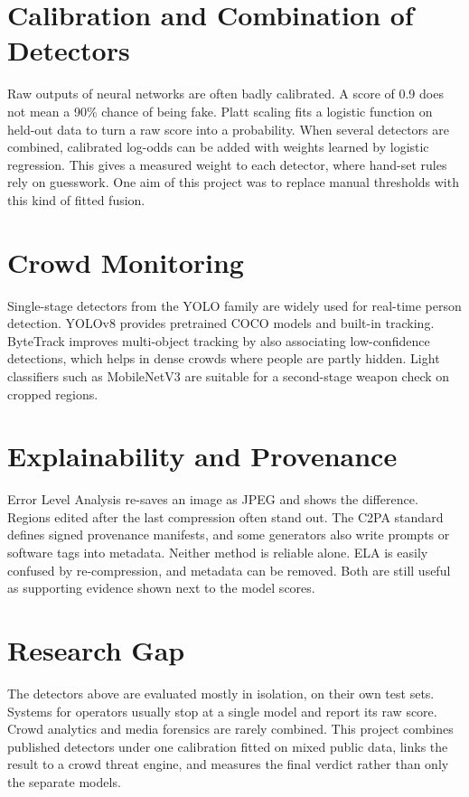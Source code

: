 \documentclass[12pt,a4paper,oneside]{report}
\begin{document}
\section{Calibration and Combination of Detectors}
Raw outputs of neural networks are often badly calibrated. A score of 0.9 does not mean a 90\% chance of being fake\cite{guo2017}. Platt scaling\cite{platt1999} fits a logistic function on held-out data to turn a raw score into a probability. When several detectors are combined, calibrated log-odds can be added with weights learned by logistic regression. This gives a measured weight to each detector, where hand-set rules rely on guesswork. One aim of this project was to replace manual thresholds with this kind of fitted fusion.

\section{Crowd Monitoring}
Single-stage detectors from the YOLO family are widely used for real-time person detection. YOLOv8\cite{jocher2023} provides pretrained COCO models and built-in tracking. ByteTrack\cite{zhang2022} improves multi-object tracking by also associating low-confidence detections, which helps in dense crowds where people are partly hidden. Light classifiers such as MobileNetV3\cite{howard2019} are suitable for a second-stage weapon check on cropped regions.

\section{Explainability and Provenance}
Error Level Analysis\cite{krawetz2007} re-saves an image as JPEG and shows the difference. Regions edited after the last compression often stand out. The C2PA standard\cite{c2pa} defines signed provenance manifests, and some generators also write prompts or software tags into metadata. Neither method is reliable alone. ELA is easily confused by re-compression, and metadata can be removed. Both are still useful as supporting evidence shown next to the model scores.

\section{Research Gap}
The detectors above are evaluated mostly in isolation, on their own test sets. Systems for operators usually stop at a single model and report its raw score. Crowd analytics and media forensics are rarely combined. This project combines published detectors under one calibration fitted on mixed public data, links the result to a crowd threat engine, and measures the final verdict rather than only the separate models.
\end{document}
